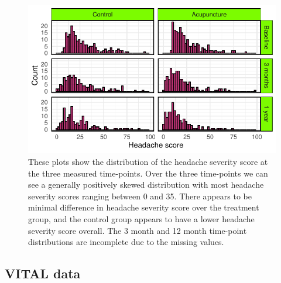 \documentclass{article}
\begin{document}
\begin{figure}

{\centering \includegraphics{Final_Report_files/figure-latex/unnamed-chunk-11-1} 

}

\caption{These plots show the distribution of the headache severity score at the three measured time-points. Over the three time-points we can see a generally positively skewed distribution with most headache severity scores ranging between 0 and 35. There appears to be minimal difference in headache severity score over the treatment group, and the control group appears to have a lower headache severity score overall. The 3 month and 12 month time-point distributions are incomplete due to the missing values.}\label{fig:unnamed-chunk-11}
\end{figure}

\newpage

\subsection{VITAL data}\label{vital-data}
\end{document}
